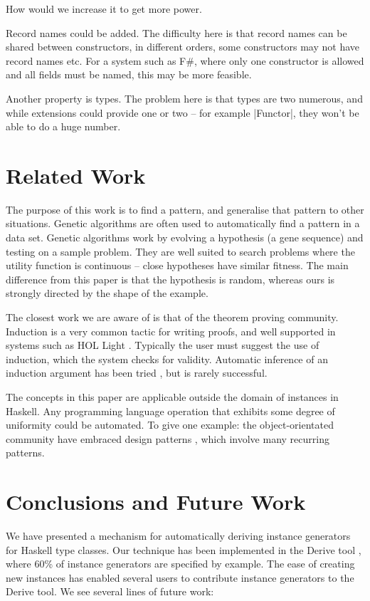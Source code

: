 \documentclass[preprint]{sigplanconf}
\begin{document}
How would we increase it to get more power.

Record names could be added. The difficulty here is that record names can be shared between constructors, in different orders, some constructors may not have record names etc. For a system such as F\#, where only one constructor is allowed and all fields must be named, this may be more feasible.

Another property is types. The problem here is that types are two numerous, and while extensions could provide one or two -- for example |Functor|, they won't be able to do a huge number.

\section{Related Work}
\label{sec:related}

The purpose of this work is to find a pattern, and generalise that pattern to other situations. Genetic algorithms \cite{genetic_algorithms} are often used to automatically find a pattern in a data set. Genetic algorithms work by evolving a hypothesis (a gene sequence) and testing on a sample problem. They are well suited to search problems where the utility function is continuous -- close hypotheses have similar fitness. The main difference from this paper is that the hypothesis is random, whereas ours is strongly directed by the shape of the example.

The closest work we are aware of is that of the theorem proving community. Induction is a very common tactic for writing proofs, and well supported in systems such as HOL Light \cite{hol_light}. Typically the user must suggest the use of induction, which the system checks for validity. Automatic inference of an induction argument has been tried \cite{mintchev:reasoning}, but is rarely successful.

The concepts in this paper are applicable outside the domain of instances in Haskell. Any programming language operation that exhibits some degree of uniformity could be automated. To give one example: the object-orientated community have embraced design patterns \cite{design_patterns}, which involve many recurring patterns.

\section{Conclusions and Future Work}
\label{sec:conclusion}

We have presented a mechanism for automatically deriving instance generators for Haskell type classes. Our technique has been implemented in the Derive tool \cite{derive}, where 60\% of instance generators are specified by example. The ease of creating new instances has enabled several users to contribute instance generators to the Derive tool. We see several lines of future work:
\end{document}
